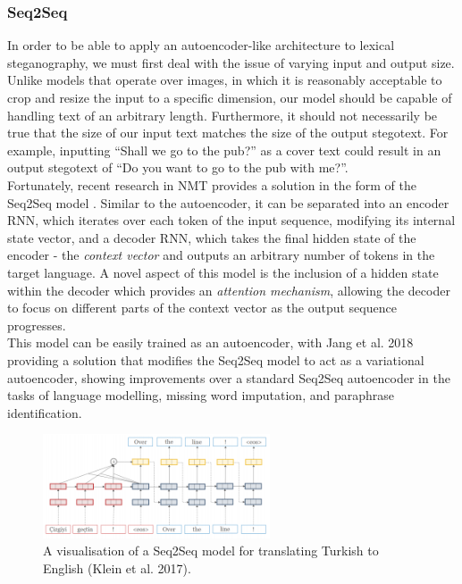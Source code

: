 \documentclass[11pt,a4paper]{article}
\begin{document}
  \vspace{-5mm}
  \subsubsection *{Seq2Seq}
  In order to be able to apply an autoencoder-like architecture to lexical steganography, we must first deal with the issue of varying input and output size. Unlike models that operate over images, in which it is reasonably acceptable to crop and resize the input to a specific dimension, our model should be capable of handling text of an arbitrary length. Furthermore, it should not necessarily be true that the size of our input text matches the size of the output stegotext. For example, inputting ``Shall we go to the pub?'' as a cover text could result in an output stegotext of ``Do you want to go to the pub with me?''.\\
  \indent Fortunately, recent research in NMT provides a solution in the form of the Seq2Seq model \cite{seq2seq}. Similar to the autoencoder, it can be separated into an encoder RNN, which iterates over each token of the input sequence, modifying its internal state vector, and a decoder RNN, which takes the final hidden state of the encoder - the \textit{context vector} and outputs an arbitrary number of tokens in the target language. A novel aspect of this model is the inclusion of a hidden state within the decoder which provides an \textit{attention mechanism}, allowing the decoder to focus on different parts of the context vector as the output sequence progresses.\\
  \indent  This model can be easily trained as an autoencoder, with\nocite{seq2seqvae} Jang et al. 2018  providing a solution that modifies the Seq2Seq model to act as a variational autoencoder, showing improvements over a standard Seq2Seq autoencoder in the tasks of language modelling, missing word imputation, and paraphrase identification.

  \nocite{opennmt}
  \begin{figure}[htp]
    \centering
    \includegraphics[width=0.6\textwidth]{nmt.png}
    \caption{A visualisation of a Seq2Seq model for translating Turkish to English (Klein et al. 2017). }
    \label{nmt}
  \end{figure}
\end{document}
